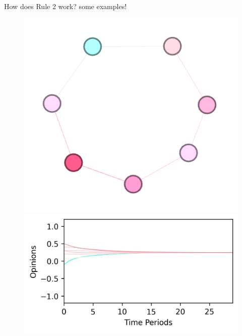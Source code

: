\documentclass[xcolor=table]{beamer}
\begin{document}
\begin{frame}{How does Rule 2 work? some examples! }
%
\begin{figure}
\centering
\begin{minipage}{.5\textwidth}
  \centering
  \includegraphics[scale = 0.55]{./img/cons_2.png}
\end{minipage}%
\begin{minipage}{.5\textwidth}
  \centering
  \includegraphics[scale = 0.55]{./img/plot_like_minded.jpg}
\end{minipage}
\end{figure}
\end{frame}
%
\end{document}
